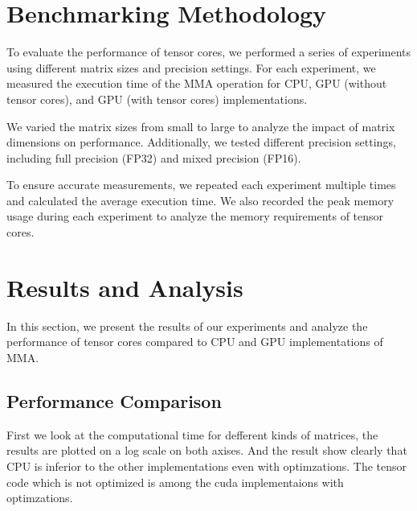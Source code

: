 \documentclass[conference]{IEEEtran}
\begin{document}
  
  \section{Benchmarking Methodology}\label{sec:benchmarking-methodology}
  
  To evaluate the performance of tensor cores, we performed a series of experiments using different 
  matrix sizes and precision settings. For each experiment, we measured the execution time of the 
  MMA operation for CPU, GPU (without tensor cores), and GPU (with tensor cores) implementations.
  
  We varied the matrix sizes from small to large to analyze the impact of matrix dimensions on 
  performance. Additionally, we tested different precision settings, including full precision (FP32)
  and mixed precision (FP16).
  
  To ensure accurate measurements, we repeated each experiment multiple times and calculated 
  the average execution time. We also recorded the peak memory usage during each experiment to 
  analyze the memory requirements of tensor cores.
  
  \section{Results and Analysis}\label{sec:results-analysis}
  
  In this section, we present the results of our experiments and analyze the performance of 
  tensor cores compared to CPU and GPU implementations of MMA.

  
  \subsection{Performance Comparison}\label{sec:performance-comparison}

  First we look at the computational time for defferent kinds of matrices,
  the results are plotted on a log scale on both axises. And the result show clearly that
  CPU is inferior to the other implementations even with optimzations.
  The tensor code which is not optimized is among the cuda implementaions with optimzations.
\end{document}

